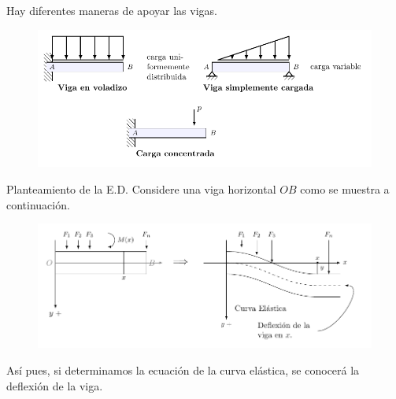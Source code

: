 \documentclass{beamer}
\begin{document}
\begin{frame}[t]
	\begin{block}{}
		Hay diferentes maneras de apoyar las vigas.
		\begin{figure}[ht]
			\centering
			\includegraphics[width= \linewidth]{IMAGENES_VIGAS/2/tikz.pdf}
		\end{figure}
	\end{block}
\end{frame}

\begin{frame}[t]
	\begin{block}{Planteamiento de la E.D.}
		Considere una viga horizontal \(OB\) como se muestra a continuación.
		\begin{figure}[ht]
			\centering
			\includegraphics[width= \linewidth]{IMAGENES_VIGAS/3/tikz.pdf}
		\end{figure}
		Así pues, si determinamos la ecuación de la curva elástica, se conocerá la deflexión de la viga.
	\end{block}
\end{frame}
\end{document}
